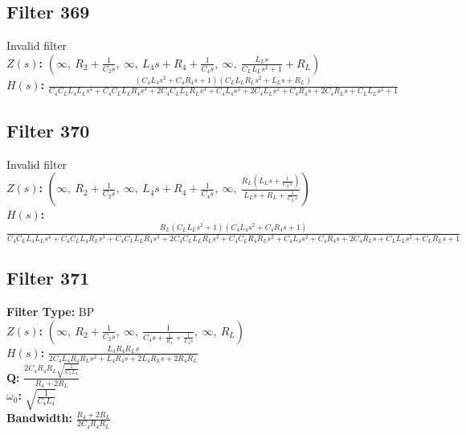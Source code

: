 \documentclass{article}
\begin{document}
\subsection*{Filter 369}
Invalid filter \\ 
\textbf{$Z(s)$:} $\left( \infty, \  R_{2} + \frac{1}{C_{2} s}, \  \infty, \  L_{4} s + R_{4} + \frac{1}{C_{4} s}, \  \infty, \  \frac{L_{L} s}{C_{L} L_{L} s^{2} + 1} + R_{L}\right)$ \\ 
\textbf{$H(s)$:} $\frac{\left(C_{4} L_{4} s^{2} + C_{4} R_{4} s + 1\right) \left(C_{L} L_{L} R_{L} s^{2} + L_{L} s + R_{L}\right)}{C_{4} C_{L} L_{4} L_{L} s^{4} + C_{4} C_{L} L_{L} R_{4} s^{3} + 2 C_{4} C_{L} L_{L} R_{L} s^{3} + C_{4} L_{4} s^{2} + 2 C_{4} L_{L} s^{2} + C_{4} R_{4} s + 2 C_{4} R_{L} s + C_{L} L_{L} s^{2} + 1}$ \\ 
\subsection*{Filter 370}
Invalid filter \\ 
\textbf{$Z(s)$:} $\left( \infty, \  R_{2} + \frac{1}{C_{2} s}, \  \infty, \  L_{4} s + R_{4} + \frac{1}{C_{4} s}, \  \infty, \  \frac{R_{L} \left(L_{L} s + \frac{1}{C_{L} s}\right)}{L_{L} s + R_{L} + \frac{1}{C_{L} s}}\right)$ \\ 
\textbf{$H(s)$:} $\frac{R_{L} \left(C_{L} L_{L} s^{2} + 1\right) \left(C_{4} L_{4} s^{2} + C_{4} R_{4} s + 1\right)}{C_{4} C_{L} L_{4} L_{L} s^{4} + C_{4} C_{L} L_{4} R_{L} s^{3} + C_{4} C_{L} L_{L} R_{4} s^{3} + 2 C_{4} C_{L} L_{L} R_{L} s^{3} + C_{4} C_{L} R_{4} R_{L} s^{2} + C_{4} L_{4} s^{2} + C_{4} R_{4} s + 2 C_{4} R_{L} s + C_{L} L_{L} s^{2} + C_{L} R_{L} s + 1}$ \\ 
\subsection*{Filter 371}
\textbf{Filter Type:} BP \\ 
\textbf{$Z(s)$:} $\left( \infty, \  R_{2} + \frac{1}{C_{2} s}, \  \infty, \  \frac{1}{C_{4} s + \frac{1}{R_{4}} + \frac{1}{L_{4} s}}, \  \infty, \  R_{L}\right)$ \\ 
\textbf{$H(s)$:} $\frac{L_{4} R_{4} R_{L} s}{2 C_{4} L_{4} R_{4} R_{L} s^{2} + L_{4} R_{4} s + 2 L_{4} R_{L} s + 2 R_{4} R_{L}}$ \\ 
\textbf{Q:} $\frac{2 C_{4} R_{4} R_{L} \sqrt{\frac{1}{C_{4} L_{4}}}}{R_{4} + 2 R_{L}}$ \\ 
\textbf{$\omega_0$:} $\sqrt{\frac{1}{C_{4} L_{4}}}$ \\ 
\textbf{Bandwidth:} $\frac{R_{4} + 2 R_{L}}{2 C_{4} R_{4} R_{L}}$ \\ 
\end{document}
